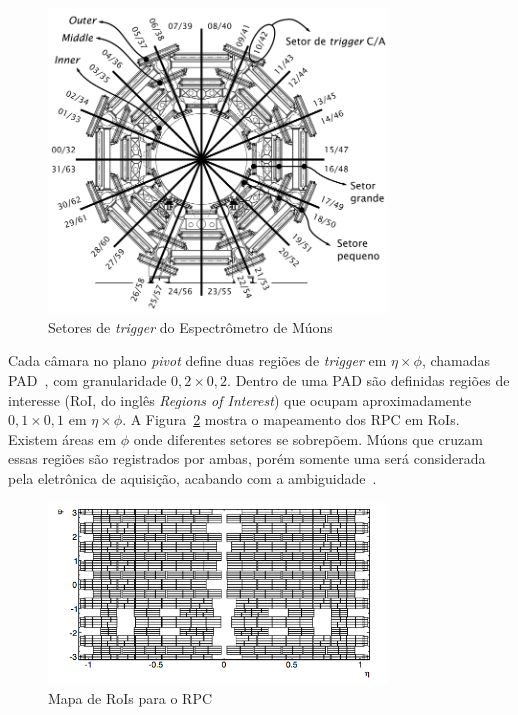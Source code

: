 \begin{figure}[htpb!]
    \centering
    \includegraphics[width=0.8\textwidth]{images/muon_sectors.png}
    \caption{Setores de \emph{trigger} do Espectrômetro de Múons}
        \label{fig:muonsector}
\end{figure}

Cada câmara no plano \emph{pivot} define duas regiões de \emph{trigger} em
$\eta \times \phi$, chamadas PAD~\cite{ANULLI2009}, com granularidade $0,2
\times 0,2$.  Dentro de uma PAD são definidas regiões de interesse (RoI, do
inglês \emph{Regions of Interest}) que ocupam aproximadamente $0,1 \times 0,1$
em $\eta \times \phi$. A Figura~\ref{fig:muonroi} mostra o mapeamento dos RPC
em RoIs. Existem áreas em $\phi$ onde diferentes setores se sobrepõem. Múons
que cruzam essas regiões são registrados por ambas, porém somente uma será
considerada pela eletrônica de aquisição, acabando com a
ambiguidade~\cite{ANULLI2009}.


\begin{figure}[htpb!]
    \centering
    \includegraphics[width=0.8\textwidth]{images/muonroi.png}
    \caption{Mapa de RoIs para o RPC}
        \label{fig:muonroi}
\end{figure}

